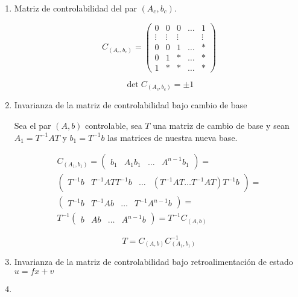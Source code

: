 \begin{enumerate}
\item Matriz de controlabilidad del par $(A_c, b_c)$.

\begin{equation}
C_{(A_c,b_c)} =
\begin{pmatrix}
0 & 0 & 0 & \dots & 1 \\
\vdots & \vdots & \vdots & & \vdots \\
0 & 0 & 1 & \dots & * \\
0 & 1 & * & \dots & * \\
1 & * & * & \dots & *
\end{pmatrix}
\end{equation}

\begin{equation}
\det{C_{(A_c, b_c)}} = \pm 1
\end{equation}

\item Invarianza de la matriz de controlabilidad bajo cambio de base

Sea el par $(A, b)$ controlable, sea $T$ una matriz de cambio de base y sean $A_1 = T^{-1} A T$ y $b_1 = T^{-1} b$ las matrices de nuestra nueva base.

\begin{multline}
C_{(A_1, b_1)} =
\begin{pmatrix}
b_1 & A_1 b_1 & \dots & A^{n-1} b_1
\end{pmatrix} = \\
\begin{pmatrix}
T^{-1} b & T^{-1} A T T^{-1} b & \dots & (T^{-1} A T \dots T^{-1} A T) T^{-1} b
\end{pmatrix} = \\
\begin{pmatrix}
T^{-1} b & T^{-1} A b & \dots & T^{-1} A^{n-1} b
\end{pmatrix} = \\
T^{-1}
\begin{pmatrix}
b & A b & \dots & A^{n-1} b
\end{pmatrix} =
T^{-1} C_{(A, b)} \nonumber
\end{multline}

\begin{equation}
T = C_{(A, b)} C_{(A_1, b_1)}^{-1}
\end{equation}

\item Invarianza de la matriz de controlabilidad bajo retroalimentación de estado $u = f x + v$



\item
\end{enumerate}

